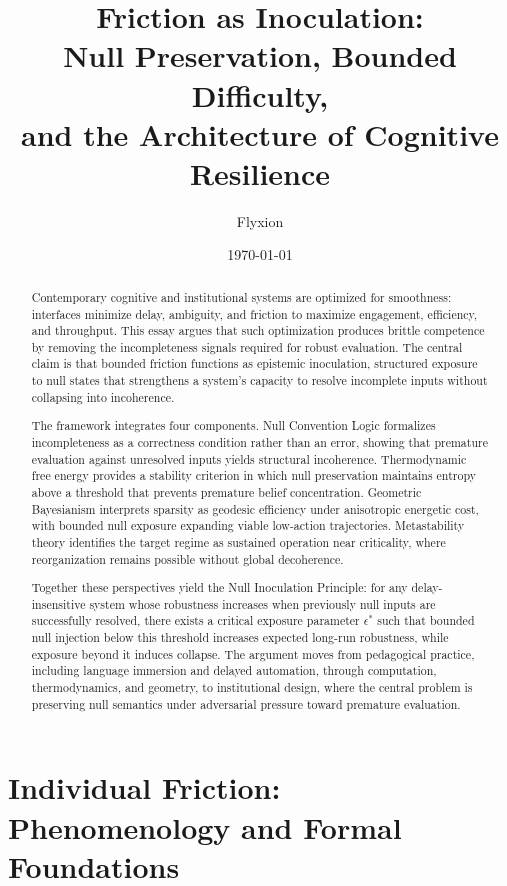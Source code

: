\documentclass[11pt]{article}
\title{\textbf{Friction as Inoculation:\\[4pt]
Null Preservation, Bounded Difficulty,\\[2pt]
and the Architecture of Cognitive Resilience}}
\author{Flyxion}
\date{\today}
\theoremstyle{remark}
\begin{document}
\maketitle

\begin{abstract}
Contemporary cognitive and institutional systems are optimized for smoothness: interfaces minimize delay, ambiguity, and friction to maximize engagement, efficiency, and throughput. This essay argues that such optimization produces brittle competence by removing the incompleteness signals required for robust evaluation. The central claim is that bounded friction functions as epistemic inoculation, structured exposure to null states that strengthens a system’s capacity to resolve incomplete inputs without collapsing into incoherence.

The framework integrates four components. Null Convention Logic formalizes incompleteness as a correctness condition rather than an error, showing that premature evaluation against unresolved inputs yields structural incoherence. Thermodynamic free energy provides a stability criterion in which null preservation maintains entropy above a threshold that prevents premature belief concentration. Geometric Bayesianism interprets sparsity as geodesic efficiency under anisotropic energetic cost, with bounded null exposure expanding viable low-action trajectories. Metastability theory identifies the target regime as sustained operation near criticality, where reorganization remains possible without global decoherence.

Together these perspectives yield the Null Inoculation Principle: for any delay-insensitive system whose robustness increases when previously null inputs are successfully resolved, there exists a critical exposure parameter $\epsilon^*$ such that bounded null injection below this threshold increases expected long-run robustness, while exposure beyond it induces collapse. The argument moves from pedagogical practice, including language immersion and delayed automation, through computation, thermodynamics, and geometry, to institutional design, where the central problem is preserving null semantics under adversarial pressure toward premature evaluation.
\end{abstract}

\tableofcontents

\newpage

\part{Individual Friction: Phenomenology and Formal Foundations}
\end{document}
